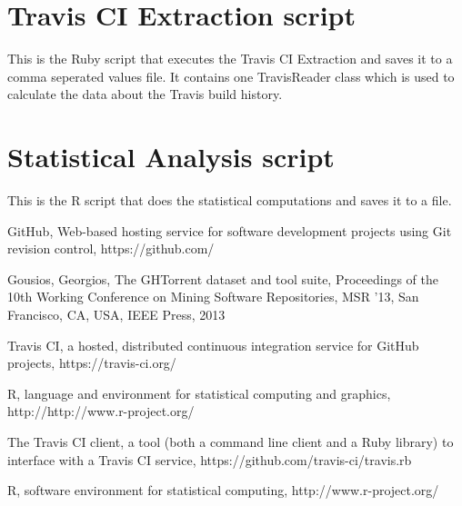 \documentclass[a4paper,11pt]{article}
\begin{document}
	\section{Travis CI Extraction script}
	\label{app:ci-extraction}
	This is the Ruby script that executes the Travis CI Extraction and saves it to a comma seperated values file.
	It contains one TravisReader class which is used to calculate the data about the Travis build history.
	
	{\scriptsize 
		
		
	}
	
	\section{Statistical Analysis script}
	\label{app:r}
	This is the R script that does the statistical computations and saves it to a file.
	{\scriptsize
	   
	}
	
	

	\begin{thebibliography}{9}
			GitHub, Web-based hosting service for software development projects using Git revision control, https://github.com/

			Gousios, Georgios, The GHTorrent dataset and tool suite, 
			Proceedings of the 10th Working Conference on Mining Software Repositories, MSR '13,
			San Francisco, CA, USA, IEEE Press, 2013

			Travis CI, a hosted, distributed continuous integration service for GitHub projects, https://travis-ci.org/

			R, language and environment for statistical computing and graphics, http://http://www.r-project.org/
			
		  The Travis CI client, a tool (both a command line client and a Ruby library) to interface with a Travis CI service,
		  https://github.com/travis-ci/travis.rb
		  
		  R, software environment for statistical computing, http://www.r-project.org/
		
	\end{thebibliography}
\end{document}
